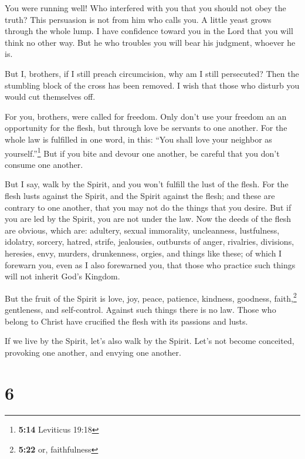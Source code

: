  You were running well! Who interfered with you that you
should not obey the truth?  This persuasion is not from
him who calls you.  A little yeast grows through the whole
lump.  I have confidence toward you in the Lord that you
will think no other way. But he who troubles you will bear his judgment,
whoever he is.

 But I, brothers, if I still preach circumcision, why am
I still persecuted? Then the stumbling block of the cross has been
removed.  I wish that those who disturb you would cut
themselves off.

 For you, brothers, were called for freedom. Only don't
use your freedom an an opportunity for the flesh, but through love be
servants to one another.  For the whole law is fulfilled
in one word, in this: ``You shall love your neighbor as
yourself.''\footnote{\textbf{5:14} Leviticus 19:18}  But
if you bite and devour one another, be careful that you don't consume
one another.

 But I say, walk by the Spirit, and you won't fulfill the
lust of the flesh.  For the flesh lusts against the
Spirit, and the Spirit against the flesh; and these are contrary to one
another, that you may not do the things that you desire. 
But if you are led by the Spirit, you are not under the law.
 Now the deeds of the flesh are obvious, which are:
adultery, sexual immorality, uncleanness, lustfulness, 
idolatry, sorcery, hatred, strife, jealousies, outbursts of anger,
rivalries, divisions, heresies,  envy, murders,
drunkenness, orgies, and things like these; of which I forewarn you,
even as I also forewarned you, that those who practice such things will
not inherit God's Kingdom.

 But the fruit of the Spirit is love, joy, peace,
patience, kindness, goodness, faith,\footnote{\textbf{5:22} or,
  faithfulness}  gentleness, and self-control. Against
such things there is no law.  Those who belong to Christ
have crucified the flesh with its passions and lusts.

 If we live by the Spirit, let's also walk by the Spirit.
 Let's not become conceited, provoking one another, and
envying one another.

\hypertarget{section-5}{%
\section{6}\label{section-5}}

